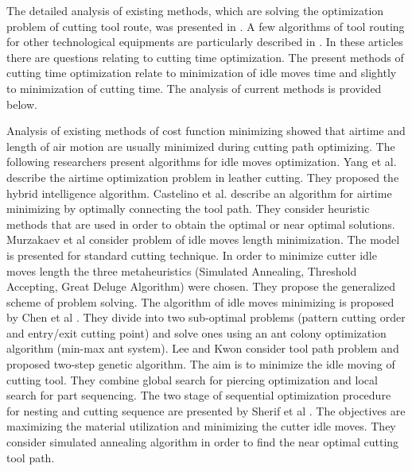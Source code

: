 \documentclass[runningheads]{llncs}
\begin{document}
The detailed analysis of existing methods,
which are solving the optimization problem
of cutting tool route, was presented in \cite{Dewil2016Nov}.
A few algorithms of tool routing for other technological equipments
are particularly described in \cite{Grotschel,Ghiani}.
In these articles there are questions relating to
cutting time optimization.
The present methods of cutting time optimization
relate to minimization of idle moves time and
slightly to minimization of cutting time.
The analysis of current methods is provided below.

Analysis  of existing methods of cost function minimizing showed that
airtime and length of air motion are usually minimized
during cutting path optimizing.
The following researchers present algorithms for idle moves optimization.
Yang et al. \cite{Yang2010}
describe the airtime optimization problem in leather cutting.
They proposed the hybrid intelligence algorithm.
Castelino et al. \cite{d2003tool}
describe an algorithm for airtime minimizing
by optimally connecting the tool path.
They consider heuristic methods
that are used in order to obtain the optimal or near optimal solutions.
Murzakaev et al \cite{ru17}
consider problem of idle moves length minimization.
The model is presented for standard cutting technique.
In order to minimize cutter idle moves length
the three metaheuristics
(Simulated Annealing, Threshold Accepting, Great Deluge Algorithm)
were chosen.
They propose the generalized scheme of problem solving.
The algorithm of idle moves minimizing is proposed by Chen et al \cite{Chen2014Dec}.
They divide into two sub-optimal problems
(pattern cutting order and entry/exit cutting point)
and solve ones using an ant colony optimization algorithm
(min-max ant system).
Lee and Kwon \cite{Lee2006Dec}
consider tool path problem and
proposed two-step genetic algorithm.
The aim is to minimize the idle moving of cutting tool.
They combine global search for piercing optimization
and local search for part sequencing.
The two stage of sequential optimization procedure for
nesting and cutting sequence are presented by Sherif et al \cite{Sherif2014Oct}.
The objectives are maximizing the material utilization
and minimizing the cutter idle moves.
They consider simulated annealing algorithm
in order to find the near optimal cutting tool path.
\end{document}
